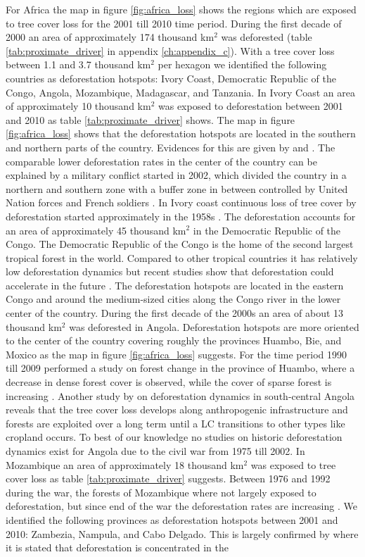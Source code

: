 			For Africa the map in figure \ref{fig:africa_loss} shows the regions which are exposed to tree cover loss for the 2001 till 2010 time period. During the first decade of 2000 an area of approximately 174 thousand km$^2$ was deforested (table \ref{tab:proximate_driver} in appendix \ref{ch:appendix_c}). With a tree cover loss between 1.1 and 3.7 thousand km$^2$ per hexagon we identified the following countries as deforestation hotspots: Ivory Coast, Democratic Republic of the Congo, Angola, Mozambique, Madagascar, and Tanzania. In Ivory Coast an area of approximately 10 thousand km$^2$ was exposed to deforestation between 2001 and 2010 as table \ref{tab:proximate_driver} shows. The map in figure \ref{fig:africa_loss} shows that the deforestation hotspots are located in the southern and northern parts of the country. Evidences for this are given by \citet{Goetze2006} and \citet{Barima2016}. The comparable lower deforestation rates in the center of the country can be explained by a military conflict started in 2002, which divided the country in a northern and southern zone with a buffer zone in between controlled by United Nation forces and French soldiers \citep{Barima2016}. In Ivory coast continuous loss of tree cover by deforestation started approximately in the 1958s \citep{Chatelain1996}. The deforestation accounts for an area of approximately 45 thousand km$^2$ in the Democratic Republic of the Congo. The Democratic Republic of the Congo is the home of the second largest tropical forest in the world. Compared to other tropical countries it has relatively low deforestation dynamics but recent studies show that deforestation could accelerate in the future \citep{Ickowitz2015}. The deforestation hotspots are located in the eastern Congo and around the medium-sized cities along the Congo river in the lower center of the country. During the first decade of the 2000s an area of about 13 thousand km$^2$ was deforested in Angola. Deforestation hotspots are more oriented to the center of the country covering roughly the provinces Huambo, Bie, and Moxico as the map in figure \ref{fig:africa_loss} suggests. For the time period 1990 till 2009 \citet{Cabral2011} performed a study on forest change in the province of Huambo, where a decrease in dense forest cover is observed, while the cover of sparse forest is increasing \citep{Cabral2011}. Another study by \citet{Schneibel2017} on deforestation dynamics in south-central Angola reveals that the tree cover loss develops along anthropogenic infrastructure and forests are exploited over a long term until a \ac{LC} transitions to other types like cropland occurs. To best of our knowledge no studies on historic deforestation dynamics exist for Angola due to the civil war from 1975 till 2002. In Mozambique an area of approximately 18 thousand km$^2$ was exposed to tree cover loss as table \ref{tab:proximate_driver} suggests. Between 1976 and 1992 during the war, the forests of Mozambique where not largely exposed to deforestation, but since end of the war the deforestation rates are increasing \citep{Sitoe2012}. We identified the following provinces as deforestation hotspots between 2001 and 2010: Zambezia, Nampula, and Cabo Delgado. This is largely confirmed by \citet{Sitoe2012} where it is stated that deforestation is concentrated in the 